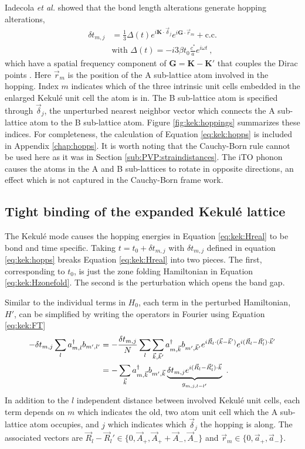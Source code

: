 Iadecola \textit{et al.} showed that the bond length alterations generate hopping alterations,
\begin{align}
	\delta t_{m,j}&=\frac{1}{3} \Delta(t) e^{i \bm{K} \cdot \vec{\delta}_j} e^{i \bm{G} \cdot \vec{r}_{m}}+\text{c.c.} \nonumber \\
	& \text{with } \Delta(t)=-i 3 \beta t_0 \frac{c^*}{a} e^{i \omega t} \label{eq:kek:hopps} \ ,
\end{align}
which have a spatial frequency component of $\bm{G}=\bm{K}-\bm{K'}$ that couples the Dirac points \cite{Iadecola2013}.
Here $\vec{r}_{m}$ is the position of the A sub-lattice atom involved in the hopping.
Index $m$ indicates which of the three intrinsic unit cells embedded in the enlarged Kekul\'e unit cell the atom is in.
The B sub-lattice atom is specified through $\vec{\delta}_j$, the unperturbed nearest neighbor vector which connects the A sub-lattice atom to the B sub-lattice atom.
Figure \ref{fig:kek:hoppings} summarizes these indices.
For completeness, the calculation of Equation \ref{eq:kek:hopps} is included in Appendix \ref{chap:hopps}.
It is worth noting that the Cauchy-Born rule cannot be used here as it was in Section \ref{sub:PVP:straindistances}.
The iTO phonon causes the atoms in the A and B sub-lattices to rotate in opposite directions, an effect which is not captured in the Cauchy-Born frame work.

\subsection{Tight binding of the expanded Kekul\'e lattice}

The Kekul\'e mode causes the hopping energies in Equation \ref{eq:kek:Hreal} to be bond and time specific.
Taking $t=t_0+\delta t_{m,j}$ with $\delta t_{m,j}$ defined in equation \ref{eq:kek:hopps} breaks Equation \ref{eq:kek:Hreal} into two pieces.
The first, corresponding to $t_0$, is just the zone folding Hamiltonian in Equation \ref{eq:kek:Hzonefold}.
The second is the perturbation which opens the band gap.

Similar to the individual terms in $H_0$, each term in the perturbed Hamiltonian, $H'$, can be simplified by writing the operators in Fourier using Equation \ref{eq:kek:FT} 
\begin{align*}
	-  \delta t_{m,j} \sum_{l} a^{\dagger}_{m,l} b_{m',l'} &= 
	    -\frac{\delta t_{m,j}}{N}\sum_l \sum_{\vec{k},\vec{k}'} a^{\dagger}_{m,\vec{k}} b_{m',\vec{k}'} 
	    e^{i \vec{R}_l \cdot (\vec{k}-\vec{k}')} e^{i(\vec{R}_l-\vec{R}_l')\cdot \vec{k}'} \\
	    &=- \sum_{\vec{k}} a^{\dagger}_{m,\vec{k}} b_{m',\vec{k}} 
	    	\underbrace{ \delta t_{m,j}  e^{i(\vec{R}_l-\vec{R}_l')\cdot \vec{k}}}_{g_{m,j,l-l'}} \ .
\end{align*}
In addition to the $l$ independent distance between involved Kekul\'e unit cells, each term depends on $m$ which indicates the old, two atom unit cell which the A sub-lattice atom occupies, and $j$ which indicates which $\vec{\delta}_j$ the hopping is along.
The associated vectors are $\vec{R}_l-\vec{R}_l' \in \{ 0, \vec{A}_+, \vec{A}_+ +\vec{A}_-,\vec{A}_- \}$ and $\vec{r}_m \in \{ 0, \vec{a}_+,\vec{a}_- \}$.

